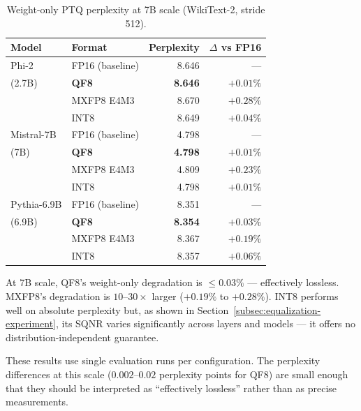 \documentclass[11pt,letterpaper]{article}
\theoremstyle{definition}
\theoremstyle{remark}
\begin{document}
\begin{table}[ht]
\centering
\caption{Weight-only PTQ perplexity at 7B scale (WikiText-2, stride 512).}
\label{tab:ptq-7b}
\begin{tabular}{@{}llrr@{}}
\toprule
Model & Format & Perplexity & $\Delta$ vs FP16 \\
\midrule
Phi-2            & FP16 (baseline) & 8.646  & ---          \\
(2.7B)           & \textbf{QF8}    & \textbf{8.646} & $\mathbf{+0.01\%}$  \\
                 & MXFP8 E4M3     & 8.670  & $+0.28\%$    \\
                 & INT8           & 8.649  & $+0.04\%$    \\
\midrule
Mistral-7B       & FP16 (baseline) & 4.798  & ---          \\
(7B)             & \textbf{QF8}    & \textbf{4.798} & $\mathbf{+0.01\%}$  \\
                 & MXFP8 E4M3     & 4.809  & $+0.23\%$    \\
                 & INT8           & 4.798  & $+0.01\%$    \\
\midrule
Pythia-6.9B      & FP16 (baseline) & 8.351  & ---          \\
(6.9B)           & \textbf{QF8}    & \textbf{8.354} & $\mathbf{+0.03\%}$  \\
                 & MXFP8 E4M3     & 8.367  & $+0.19\%$    \\
                 & INT8           & 8.357  & $+0.06\%$    \\
\bottomrule
\end{tabular}
\end{table}

At 7B scale, QF8's weight-only degradation is ${\leq}0.03\%$ --- effectively
lossless.
MXFP8's degradation is $10$--$30\times$ larger ($+0.19\%$ to $+0.28\%$).
INT8 performs well on absolute perplexity but, as shown in
Section~\ref{subsec:equalization-experiment}, its SQNR varies significantly
across layers and models --- it offers no distribution-independent guarantee.

These results use single evaluation runs per configuration.
The perplexity differences at this scale ($0.002$--$0.02$ perplexity points
for QF8) are small enough that they should be interpreted as
``effectively lossless'' rather than as precise measurements.
\end{document}

